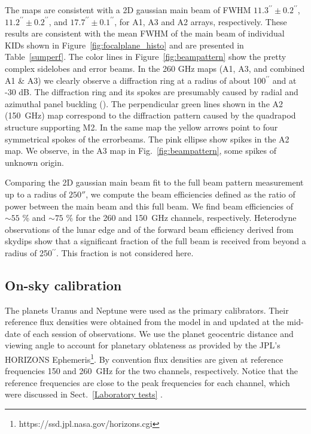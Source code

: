 \documentclass[]{aa} %
\begin{document}
The maps are consistent with a 2D gaussian main beam of FWHM $11.3^{\prime \prime} \pm 0.2^{\prime \prime}$, $11.2^{\prime \prime} \pm 0.2^{\prime \prime}$, and $17.7^{\prime \prime} \pm 0.1^{\prime \prime}$, for A1, A3 and A2 arrays, respectively. These results are consistent with the mean FWHM of the main beam of individual KIDs shown in Figure~\ref{fig:focalplane_histo} and are presented in Table~\ref{sumperf}. The color lines in Figure~\ref{fig:beampattern} show the pretty complex sidelobes and error beams. In the 260 GHz maps (A1, A3, and combined A1 \& A3) we clearly observe a diffraction ring at a radius of about 100$^{\prime \prime}$ and at -30 dB. The diffraction ring and its spokes are presumably caused by radial and azimuthal panel buckling (\cite{greve1998}). The perpendicular green lines shown in the A2 (150~GHz) map correspond to the diffraction pattern caused by the quadrapod structure supporting M2. In the same map the yellow arrows point to four symmetrical spokes of the errorbeams. The pink ellipse show spikes in the A2 map. We observe, in the A3 map in Fig.~\ref{fig:beampattern}, some spikes of unknown origin.

Comparing the 2D gaussian main beam fit to the full beam pattern measurement up to a radius of $250''$, we compute the beam efficiencies defined as the ratio of power between the main beam and this full beam. We find beam efficiencies of $\sim 55$ \% and $\sim 75$ \% for the 260 and 150~GHz channels, respectively.
Heterodyne observations of the lunar edge and of the forward beam efficiency derived from skydips show that a significant fraction of the full beam is received from beyond a radius of 250$^{\prime \prime}$. This fraction is not considered here.

\subsection{On-sky calibration}
\label{On-sky calibration}

The planets Uranus and Neptune were used as the primary calibrators. Their reference flux densities were obtained from the model in \cite{moreno2010, Bendo2013} 
and updated at the mid-date of each session of observations. We use the planet geocentric distance and viewing angle to account for planetary oblateness as provided by the JPL's HORIZONS Ephemeris\footnote{https://ssd.jpl.nasa.gov/horizons.cgi}. By convention flux densities are given at reference frequencies 150 and 260~GHz for the two channels, respectively. Notice that the reference frequencies are close to the peak frequencies for each channel, which were discussed in Sect.~\ref{Laboratory tests} .
\end{document}
